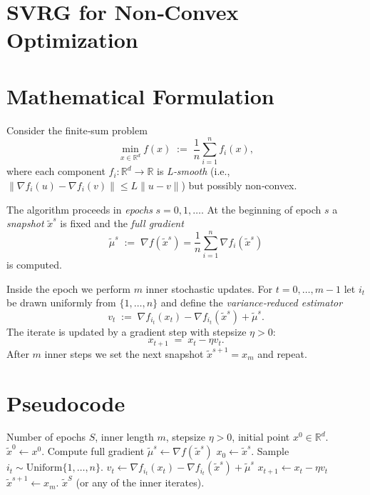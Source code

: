 \documentclass{article}
\newcommand{\R}{\mathbb{R}}
\begin{document}
\section*{SVRG for Non‑Convex Optimization}

\section*{Mathematical Formulation}
Consider the finite‑sum problem  
\[
\min_{x\in\R^{d}} f(x)\;:=\;\frac1n\sum_{i=1}^{n} f_i(x),
\]
where each component $f_i:\R^{d}\to\R$ is \emph{L‑smooth} (i.e., $\|\nabla f_i(u)-\nabla f_i(v)\|\le L\|u-v\|$) but possibly non‑convex.  

The algorithm proceeds in \emph{epochs} $s=0,1,\dots$.  
At the beginning of epoch $s$ a \emph{snapshot} $\tilde{x}^{s}$ is fixed and the \emph{full gradient}
\[
\tilde{\mu}^{s}\;:=\;\nabla f(\tilde{x}^{s})=\frac1n\sum_{i=1}^{n}\nabla f_i(\tilde{x}^{s})
\tag{1}
\]
is computed.  

Inside the epoch we perform $m$ inner stochastic updates.  For $t=0,\dots,m-1$ let $i_t$ be drawn uniformly from $\{1,\dots,n\}$ and define the \emph{variance‑reduced estimator}
\[
v_t \;:=\; \nabla f_{i_t}(x_t)-\nabla f_{i_t}(\tilde{x}^{s})+\tilde{\mu}^{s}.
\tag{2}
\]
The iterate is updated by a gradient step with stepsize $\eta>0$:
\[
x_{t+1}\;=\;x_t-\eta v_t .
\tag{3}
\]
After $m$ inner steps we set the next snapshot $\tilde{x}^{s+1}=x_{m}$ and repeat.

\section*{Pseudocode}
\begin{algorithm}[H]
\caption{SVRG (non‑convex version)}\label{alg:svrg}
\begin{algorithmic}[1]
\Require Number of epochs $S$, inner length $m$, stepsize $\eta>0$, initial point $x^{0}\in\R^{d}$.
\State $\tilde{x}^{0}\gets x^{0}$.
    \State Compute full gradient $\tilde{\mu}^{s}\gets \nabla f(\tilde{x}^{s})$ 
    \State $x_{0}\gets \tilde{x}^{s}$.
        \State Sample $i_t\sim\mathrm{Uniform}\{1,\dots,n\}$.
        \State $v_t \gets \nabla f_{i_t}(x_t)-\nabla f_{i_t}(\tilde{x}^{s})+\tilde{\mu}^{s}$ 
        \State $x_{t+1}\gets x_t-\eta v_t$ 
    \EndFor
    \State $\tilde{x}^{s+1}\gets x_{m}$.
\EndFor
\State \Return $\tilde{x}^{S}$ (or any of the inner iterates).
\end{algorithmic}
\end{algorithm}
\end{document}

